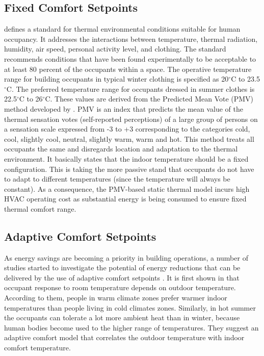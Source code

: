 \subsection{Fixed Comfort Setpoints}

\cite{ashrae2013thermal} defines a standard for thermal environmental conditions suitable for human occupancy. It addresses the interactions between temperature, thermal radiation, humidity, air speed, personal activity level, and clothing. The standard recommends conditions that have been found experimentally to be acceptable to at least 80 percent of the occupants within a space. The operative temperature range for building occupants in typical winter clothing %
 is specified as 20$^\circ$C to 23.5$^\circ$C. The preferred temperature range for occupants dressed in summer clothes %
 is 22.5$^\circ$C to 26$^\circ$C. These values are derived from the Predicted Mean Vote (PMV) method developed by \cite{fanger1970thermal}. PMV is an index that predicts the mean value of the thermal sensation votes (self-reported perceptions) of a large group of persons on a sensation scale expressed from -3 to +3 corresponding to the categories cold, cool, slightly cool, neutral, slightly warm, warm and hot.
This method treats all occupants the same and disregards location and adaptation to the thermal environment. It basically states that the indoor temperature should be a fixed configuration. This is taking the more passive stand that occupants do not have to adapt to different temperatures (since the temperature will always be constant). As a consequence, the PMV-based static thermal model incurs high HVAC operating cost as substantial energy is being consumed to ensure fixed thermal comfort range.

\subsection{Adaptive Comfort Setpoints}

As energy savings are becoming a priority in building operations, a number of studies started to investigate the potential of energy reductions that can be delivered by the use of adaptive comfort setpoints \citep{mui2003adaptive,egan2010the,schumann2010learning,ward2010automate,yang2013development,west2014trial,chew2015adaptive}. It is first shown in \cite{de1998developing} that occupant response to room temperature depends on outdoor temperature. According to them, people in warm climate zones prefer warmer indoor temperatures than people living in cold climates zones. Similarly, in hot summer the occupants can tolerate a lot more ambient heat than in winter, because human bodies become used to the higher range of temperatures. They suggest an adaptive comfort model that correlates the outdoor temperature with indoor comfort temperature. 

